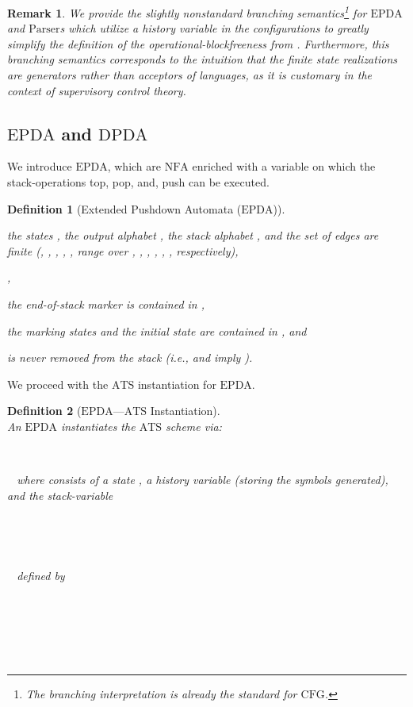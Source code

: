 \documentclass[draft]{ifacconf}
\newtheorem{remark}{Remark}
\newtheorem{definition}{Definition}
\newcommand{\ATS}{\ensuremath{\mathrm{ATS}}\xspace}
\newcommand{\Parser}{\ensuremath{\mathrm{Parser}}\xspace}
\newcommand{\CFG}{\ensuremath{\mathrm{CFG}}\xspace}
\newcommand{\NFA}{\ensuremath{\mathrm{NFA}}\xspace}
\newcommand{\EPDA}{\ensuremath{\mathrm{EPDA}}\xspace}
\newcommand{\DPDA}{\ensuremath{\mathrm{DPDA}}\xspace}
\newcommand{\OUTm}[1]{o_{\var{m}}\ifthenelse{\isempty{#1}}{}{(#1)}}
\newcommand{\OUTum}[1]{o_{\var{um}}\ifthenelse{\isempty{#1}}{}{(#1)}}
\newcommand{\instantiate}[1]{{\fboxsep1pt\fbox{}}}
\begin{document}
\begin{remark}
We provide the slightly nonstandard branching semantics\footnote{The branching interpretation is already the standard for \CFG.} for \EPDA and \Parser{}s which utilize a history variable in the configurations to greatly simplify the definition of the operational-blockfreeness from .
Furthermore, this branching semantics corresponds to the intuition that the finite state realizations are generators rather than acceptors of languages, as it is customary in the context of supervisory control theory.

\end{remark}
\newrobustcmd{\ENDOFSTACK}{\ensuremath{\Box}\xspace}
\subsection{\EPDA and \DPDA}
We introduce \EPDA, which are \NFA enriched with a variable on which the stack-operations top, pop, and, push can be executed.
\begin{definition}[Extended Pushdown Automata (\EPDA)]\label{def:PDA}\leavevmode\\
 \IFF
\begin{inparaenum}[(i)]
\item the states , the output alphabet , the stack alphabet , and the set of edges  are finite (, , , , ,  range over , , , , , , respectively),
\item ,
\item the end-of-stack marker  is contained in ,
\item the marking states  and the initial state  are contained in , and
\item  is never removed from the stack (i.e.,  and  imply ).
\end{inparaenum}
\end{definition}
We proceed with the \ATS instantiation for \EPDA.
\begin{definition}[\EPDA---\ATS Instantiation]\label{def:PDAsemantics}\leavevmode\\
An \EPDA  instantiates the \ATS scheme  via:
\begin{inparaenum}[(i)]
\item \instantiate{E}~
\item \instantiate{C}~ where  consists of a state , a history variable  (storing the symbols generated), and the stack-variable 
\item \instantiate{S}~
\item \instantiate{\pi_S(\STATEELEM,\SIGMASTR,\STACKSTR)}~
\item \instantiate{R}~ defined by 
\item \instantiate{c_0} 
\item \instantiate{A}~
\item \instantiate{O}~
\item \instantiate{\OUTm{\STATEELEM,\SIGMASTR,\STACKSTR},\OUTum{\STATEELEM,\SIGMASTR,\STACKSTR}}~
\end{inparaenum}
\end{definition}
\end{document}
